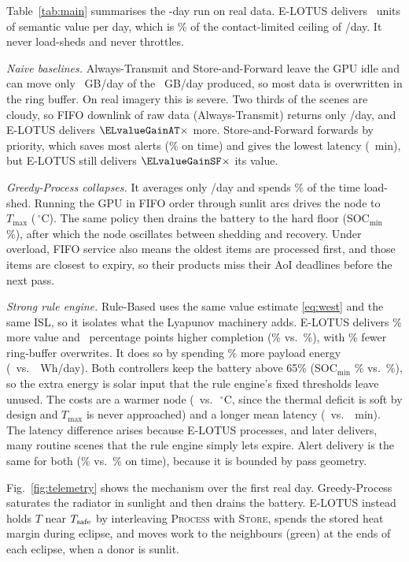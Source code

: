 Table~\ref{tab:main} summarises the \Days-day run on real data. E-LOTUS delivers \ELvalueDay\ units of semantic value per day, which is \ELceil\% of the contact-limited ceiling of \CeilDay/day. It never load-sheds and never throttles.

\emph{Naive baselines.} Always-Transmit and Store-and-Forward leave the GPU idle and can move only \DlGBDay~GB/day of the \RawGBDay~GB/day produced, so most data is overwritten in the ring buffer. On real imagery this is severe. Two thirds of the scenes are cloudy, so FIFO downlink of raw data (Always-Transmit) returns only \ATvalueDay/day, and E-LOTUS delivers $\ELvalueGainAT\times$ more. Store-and-Forward forwards by priority, which saves most alerts (\SFalerts\% on time) and gives the lowest latency (\SFlat~min), but E-LOTUS still delivers $\ELvalueGainSF\times$ its value.

\emph{Greedy-Process collapses.} It averages only \GPvalueDay/day and spends \GPshed\% of the time load-shed. Running the GPU in FIFO order through sunlit arcs drives the node to $T_{\max}$ (\GPtmax\,$^\circ$C). The same policy then drains the battery to the hard floor (SOC$_{\min}$ \GPsocmin\%), after which the node oscillates between shedding and recovery. Under overload, FIFO service also means the oldest items are processed first, and those items are closest to expiry, so their products miss their AoI deadlines before the next pass.

\emph{Strong rule engine.} Rule-Based uses the same value estimate \eqref{eq:west} and the same ISL, so it isolates what the Lyapunov machinery adds. E-LOTUS delivers \ELvalueGainRB\% more value and \ELcomplDelta~percentage points higher completion (\ELcompl\% vs.\ \RBcompl\%), with \ELovfRed\% fewer ring-buffer overwrites. It does so by spending \ELenergyDeltaPct\% more payload energy (\ELenergy\ vs.\ \RBenergy~Wh/day). Both controllers keep the battery above 65\% (SOC$_{\min}$ \ELsocmin\% vs.\ \RBsocmin\%), so the extra energy is solar input that the rule engine's fixed thresholds leave unused. The costs are a warmer node (\ELtmax\ vs.\ \RBtmax\,$^\circ$C, since the thermal deficit is soft by design and $T_{\max}$ is never approached) and a longer mean latency (\ELlat\ vs.\ \RBlat~min). The latency difference arises because E-LOTUS processes, and later delivers, many routine scenes that the rule engine simply lets expire. Alert delivery is the same for both (\ELalerts\% vs.\ \RBalerts\% on time), because it is bounded by pass geometry.

Fig.~\ref{fig:telemetry} shows the mechanism over the first real day. Greedy-Process saturates the radiator in sunlight and then drains the battery. E-LOTUS instead holds $T$ near $T_{\rm safe}$ by interleaving \textsc{Process} with \textsc{Store}, spends the stored heat margin during eclipse, and moves work to the neighbours (green) at the ends of each eclipse, when a donor is sunlit.


